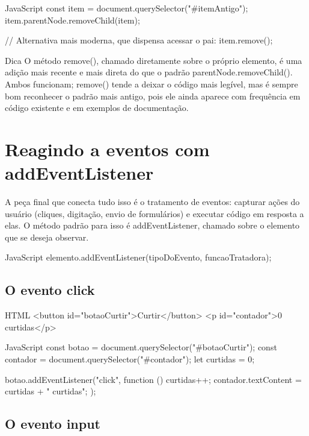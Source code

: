 \begin{codebox}{JavaScript}
const item = document.querySelector("#itemAntigo");
item.parentNode.removeChild(item);

// Alternativa mais moderna, que dispensa acessar o pai:
item.remove();
\end{codebox}

\begin{infobox}{Dica}
O método remove(), chamado diretamente sobre o próprio elemento, é uma adição mais recente e mais direta do que o padrão parentNode.removeChild(). Ambos funcionam; remove() tende a deixar o código mais legível, mas é sempre bom reconhecer o padrão mais antigo, pois ele ainda aparece com frequência em código existente e em exemplos de documentação.
\end{infobox}

\section{Reagindo a eventos com addEventListener}

A peça final que conecta tudo isso é o tratamento de eventos: capturar ações do usuário (cliques, digitação, envio de formulários) e executar código em resposta a elas. O método padrão para isso é addEventListener, chamado sobre o elemento que se deseja observar.

\begin{codebox}{JavaScript}
 elemento.addEventListener(tipoDoEvento, funcaoTratadora);
\end{codebox}

\subsection{O evento click}

\begin{codebox}{HTML}
 <button id="botaoCurtir">Curtir</button>
 <p id="contador">0 curtidas</p>
\end{codebox}

\begin{codebox}{JavaScript}
 const botao = document.querySelector("#botaoCurtir");
 const contador = document.querySelector("#contador");
 let curtidas = 0;

 botao.addEventListener("click", function () {
   curtidas++;
   contador.textContent = curtidas + " curtidas";
 });
\end{codebox}

\subsection{O evento input}

